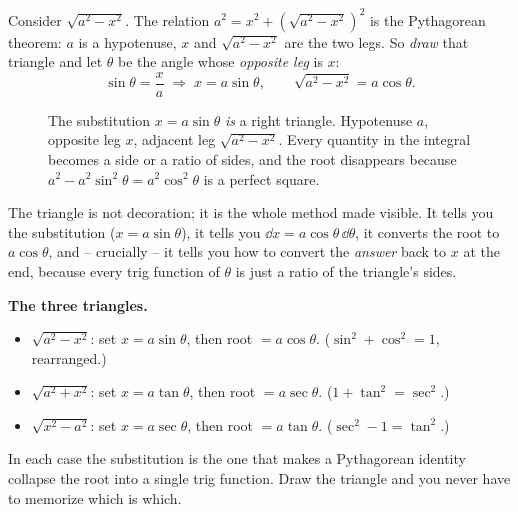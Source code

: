 Consider $\sqrt{a^2 - x^2}$. The relation $a^2 = x^2 + (\sqrt{a^2-x^2})^2$ is
the Pythagorean theorem: $a$ is a hypotenuse, $x$ and $\sqrt{a^2-x^2}$ are the
two legs. So \emph{draw} that triangle and let $\theta$ be the angle whose
\emph{opposite leg} is $x$:
\[
\sin\theta = \frac{x}{a} \;\Longrightarrow\; x = a\sin\theta,
\qquad
\sqrt{a^2 - x^2} = a\cos\theta.
\]

\begin{figure}[H]
\centering
{}
\caption{The substitution $x = a\sin\theta$ \emph{is} a right triangle.
Hypotenuse $a$, opposite leg $x$, adjacent leg $\sqrt{a^2-x^2}$. Every quantity
in the integral becomes a side or a ratio of sides, and the root disappears
because $a^2 - a^2\sin^2\theta = a^2\cos^2\theta$ is a perfect square.}
\label{ch24:fig-triangle}
\end{figure}

The triangle is not decoration; it is the whole method made visible. It tells
you the substitution ($x = a\sin\theta$), it tells you $\dd x = a\cos\theta\,
\dd\theta$, it converts the root to $a\cos\theta$, and -- crucially -- it tells
you how to convert the \emph{answer} back to $x$ at the end, because every trig
function of $\theta$ is just a ratio of the triangle's sides.

\begin{focusbox}
\textbf{The three triangles.}
\begin{itemize}
\item $\sqrt{a^2 - x^2}$: set $x = a\sin\theta$, then root $= a\cos\theta$.
   ($\sin^2 + \cos^2 = 1$, rearranged.)
\item $\sqrt{a^2 + x^2}$: set $x = a\tan\theta$, then root $= a\sec\theta$.
   ($1 + \tan^2 = \sec^2$.)
\item $\sqrt{x^2 - a^2}$: set $x = a\sec\theta$, then root $= a\tan\theta$.
   ($\sec^2 - 1 = \tan^2$.)
\end{itemize}
In each case the substitution is the one that makes a Pythagorean identity
collapse the root into a single trig function. Draw the triangle and you never
have to memorize which is which.
\end{focusbox}

